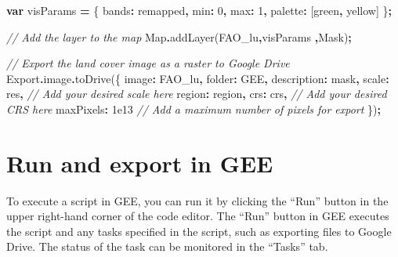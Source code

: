 \documentclass[
  10pt,
  b5paper,
  oneside]{book}
\newenvironment{Shaded}{\begin{snugshade}}{\end{snugshade}}
\newcommand{\AttributeTok}[1]{\textcolor[rgb]{0.77,0.63,0.00}{#1}}
\newcommand{\BuiltInTok}[1]{#1}
\newcommand{\CommentTok}[1]{\textcolor[rgb]{0.56,0.35,0.01}{\textit{#1}}}
\newcommand{\DataTypeTok}[1]{\textcolor[rgb]{0.13,0.29,0.53}{#1}}
\newcommand{\DecValTok}[1]{\textcolor[rgb]{0.00,0.00,0.81}{#1}}
\newcommand{\FloatTok}[1]{\textcolor[rgb]{0.00,0.00,0.81}{#1}}
\newcommand{\FunctionTok}[1]{\textcolor[rgb]{0.00,0.00,0.00}{#1}}
\newcommand{\KeywordTok}[1]{\textcolor[rgb]{0.13,0.29,0.53}{\textbf{#1}}}
\newcommand{\NormalTok}[1]{#1}
\newcommand{\OperatorTok}[1]{\textcolor[rgb]{0.81,0.36,0.00}{\textbf{#1}}}
\newcommand{\StringTok}[1]{\textcolor[rgb]{0.31,0.60,0.02}{#1}}
\begin{document}
\begin{Shaded}
\begin{Highlighting}[]
\KeywordTok{var}\NormalTok{ visParams }\OperatorTok{=}\NormalTok{ \{}
  \DataTypeTok{bands}\OperatorTok{:} \StringTok{\textquotesingle{}remapped\textquotesingle{}}\OperatorTok{,}
  \DataTypeTok{min}\OperatorTok{:} \DecValTok{0}\OperatorTok{,}
  \DataTypeTok{max}\OperatorTok{:} \DecValTok{1}\OperatorTok{,}
  \DataTypeTok{palette}\OperatorTok{:}\NormalTok{ [}\StringTok{\textquotesingle{}green\textquotesingle{}}\OperatorTok{,} \StringTok{\textquotesingle{}yellow\textquotesingle{}}\NormalTok{]}
\NormalTok{\}}\OperatorTok{;}

\CommentTok{// Add the layer to the map}
\BuiltInTok{Map}\OperatorTok{.}\FunctionTok{addLayer}\NormalTok{(FAO\_lu}\OperatorTok{,}\NormalTok{visParams }\OperatorTok{,}\StringTok{\textquotesingle{}Mask\textquotesingle{}}\NormalTok{)}\OperatorTok{;}

\CommentTok{// Export the land cover image as a raster to Google Drive}
\NormalTok{Export}\OperatorTok{.}\AttributeTok{image}\OperatorTok{.}\FunctionTok{toDrive}\NormalTok{(\{}
  \DataTypeTok{image}\OperatorTok{:}\NormalTok{ FAO\_lu}\OperatorTok{,}
  \DataTypeTok{folder}\OperatorTok{:} \StringTok{\textquotesingle{}GEE\textquotesingle{}}\OperatorTok{,}
  \DataTypeTok{description}\OperatorTok{:} \StringTok{\textquotesingle{}mask\textquotesingle{}}\OperatorTok{,}
  \DataTypeTok{scale}\OperatorTok{:}\NormalTok{ res}\OperatorTok{,} \CommentTok{// Add your desired scale here}
  \DataTypeTok{region}\OperatorTok{:}\NormalTok{ region}\OperatorTok{,}
  \DataTypeTok{crs}\OperatorTok{:}\NormalTok{ crs}\OperatorTok{,} \CommentTok{// Add your desired CRS here}
  \DataTypeTok{maxPixels}\OperatorTok{:} \FloatTok{1e13} \CommentTok{// Add a maximum number of pixels for export }
\NormalTok{\})}\OperatorTok{;}
\end{Highlighting}
\end{Shaded}

\hypertarget{run-and-export-in-gee}{%
\section{Run and export in GEE}\label{run-and-export-in-gee}}

To execute a script in GEE, you can run it by clicking the ``Run'' button in the upper right-hand corner of the code editor. The ``Run'' button in GEE executes the script and any tasks specified in the script, such as exporting files to Google Drive. The status of the task can be monitored in the ``Tasks'' tab.
\end{document}
